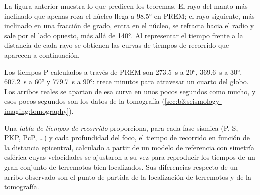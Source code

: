 \begin{omfigure}
\par{}
\label{fig:b3:seismology-imaging:rays}
\end{omfigure}

La figura anterior muestra lo que predicen los teoremas. El rayo del manto más inclinado que
apenas roza el núcleo llega a \ang{98.5} en PREM; el rayo siguiente, más inclinado en una fracción de
grado, entra en el núcleo, se refracta hacia el radio y sale
por el lado opuesto, más allá de \ang{140}. Al representar el tiempo frente a la distancia de
cada rayo se obtienen las curvas de tiempos de recorrido que aparecen a continuación.

Los tiempos P calculados a través de PREM son \qty{273.5}{s} a \ang{20},
\qty{369.6}{s} a \ang{30}, \qty{607.2}{s} a \ang{60} y \qty{779.7}{s} a
\ang{90}: trece minutos para atravesar un cuarto del globo.
Los arribos reales se apartan de esa curva en unos pocos segundos como mucho, y esos pocos
segundos son los datos de la tomografía (\cref{sec:b3:seismology-imaging:tomography}).

\begin{definition}\label{def:b3:seismology-imaging:tables}
Una \emph{tabla de tiempos de recorrido} proporciona, para cada
fase sísmica (P, S, PKP, PcP, \dots) y cada profundidad del foco, el tiempo de recorrido en función de la
distancia epicentral, calculado a partir de un modelo de referencia con simetría esférica
cuyas velocidades se ajustaron a su vez para reproducir los tiempos de un
gran conjunto de terremotos bien localizados. Sus diferencias respecto de un
arribo observado son el punto de partida de la localización de terremotos y de la tomografía.
\end{definition}

